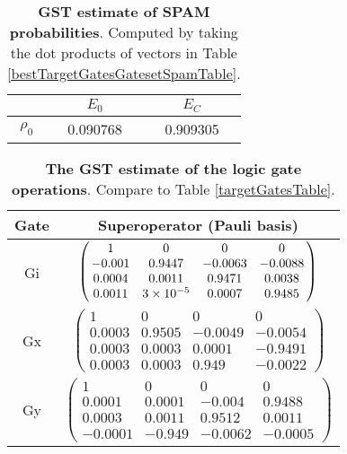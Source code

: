{\begin{table}[h]
\begin{center}
\begin{tabular}[l]{|c|c|c|}
\hline
 & $E_{0}$ & $E_C$ \\ \hline
$\rho_{0}$ & 0.090768 & 0.909305 \\ \hline
\end{tabular}

\caption{\textbf{GST estimate of SPAM probabilities}.  Computed by taking the dot products of vectors in Table \ref{bestTargetGatesGatesetSpamTable}.\label{bestTargetGatesGatesetSpamParametersTable}}
\end{center}
\end{table}

\begin{table}[h]
\begin{center}
\begin{tabular}[l]{|c|c|}
\hline
Gate & Superoperator (Pauli basis) \\ \hline
Gi & $ \left(\!\!\begin{array}{cccc}
1 & 0 & 0 & 0 \\ 
-0.001 & 0.9447 & -0.0063 & -0.0088 \\ 
0.0004 & 0.0011 & 0.9471 & 0.0038 \\ 
0.0011 & 3\times 10^{-5} & 0.0007 & 0.9485
 \end{array}\!\!\right) $
 \\ \hline
Gx & $ \left(\!\!\begin{array}{cccc}
1 & 0 & 0 & 0 \\ 
0.0003 & 0.9505 & -0.0049 & -0.0054 \\ 
0.0003 & 0.0003 & 0.0001 & -0.9491 \\ 
0.0003 & 0.0003 & 0.949 & -0.0022
 \end{array}\!\!\right) $
 \\ \hline
Gy & $ \left(\!\!\begin{array}{cccc}
1 & 0 & 0 & 0 \\ 
0.0001 & 0.0001 & -0.004 & 0.9488 \\ 
0.0003 & 0.0011 & 0.9512 & 0.0011 \\ 
-0.0001 & -0.949 & -0.0062 & -0.0005
 \end{array}\!\!\right) $
 \\ \hline
\end{tabular}

\caption{\textbf{The GST estimate of the logic gate operations}.  Compare to Table \ref{targetGatesTable}.\label{bestTargetGatesGatesetGatesTable}}
\end{center}
\end{table}

}
